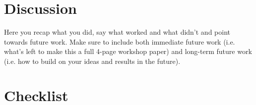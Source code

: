 \documentclass{article}
\begin{document}
\section{Discussion}
Here you recap what you did, say what worked and what didn't and point towards future work.
Make sure to include both immediate future work (i.e. what's left to make this a full 4-page workshop paper) and long-term future work (i.e. how to build on your ideas and results in the future).

\newpage



\newpage
\section*{Checklist}
\end{document}
